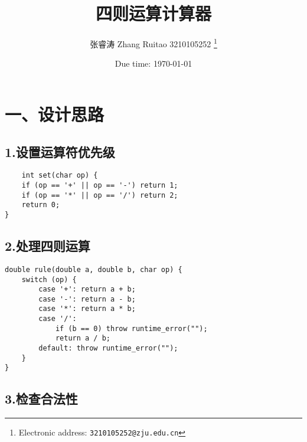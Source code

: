 \documentclass[a4paper]{article}
\begin{document}
\title{四则运算计算器}

\author{张睿涛 Zhang Ruitao 3210105252
  \thanks{Electronic address: \texttt{3210105252@zju.edu.cn}}}

\date{Due time: \today}
\maketitle
\section*{一、设计思路}
\subsection*{1.设置运算符优先级}
\begin{lstlisting}
    int set(char op) {
    if (op == '+' || op == '-') return 1;
    if (op == '*' || op == '/') return 2;
    return 0;
}
\end{lstlisting}
\subsection*{2.处理四则运算}
\begin{lstlisting}
double rule(double a, double b, char op) {
    switch (op) {
        case '+': return a + b;
        case '-': return a - b;
        case '*': return a * b;
        case '/': 
            if (b == 0) throw runtime_error("");
            return a / b;
        default: throw runtime_error("");
    }
}
\end{lstlisting}
\subsection*{3.检查合法性}
\end{document}
